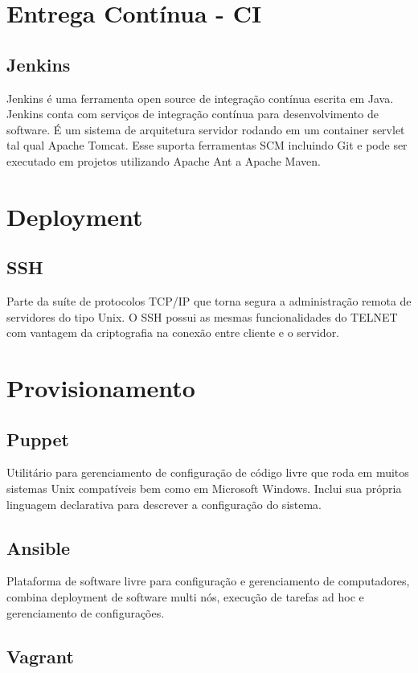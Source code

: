     \section{Entrega Contínua - CI}
	\subsection{Jenkins} Jenkins é uma ferramenta open source de 
	integração contínua escrita em Java. Jenkins conta com serviços 
	de integração contínua para desenvolvimento de software. 
	É um sistema de arquitetura servidor rodando em um container 
	servlet tal qual Apache Tomcat. Esse suporta ferramentas SCM 
	incluindo Git e pode ser executado em projetos utilizando 
	Apache Ant a Apache Maven.

    \section{Deployment}
	\subsection{SSH}Parte da suíte de protocolos TCP/IP que torna 
	segura a administração remota de servidores do tipo Unix. O SSH 
	possui as mesmas funcionalidades do TELNET com vantagem da 
	criptografia na conexão entre cliente e o servidor.

    \section{Provisionamento}

	\subsection{Puppet} Utilitário para gerenciamento de configuração de 
	código livre que roda em muitos sistemas Unix compatíveis bem como 
	em Microsoft Windows. Inclui sua própria linguagem declarativa para 
	descrever a configuração do sistema.

	\subsection{Ansible} Plataforma de software livre para configuração e 
	gerenciamento de computadores, combina deployment de software multi 
	nós, execução de tarefas ad hoc e gerenciamento de configurações.
	
	\subsection{Vagrant} 


